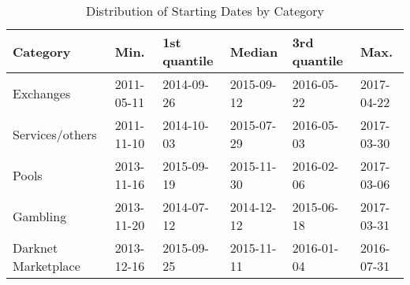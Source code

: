 \begin{table}[ht]
\centering
\begin{tabular}{llllll}
  \hline
Category & Min. & 1st quantile & Median & 3rd quantile & Max. \\ 
  \hline
Exchanges & 2011-05-11 & 2014-09-26 & 2015-09-12 & 2016-05-22 & 2017-04-22 \\ 
  Services/others & 2011-11-10 & 2014-10-03 & 2015-07-29 & 2016-05-03 & 2017-03-30 \\ 
  Pools & 2013-11-16 & 2015-09-19 & 2015-11-30 & 2016-02-06 & 2017-03-06 \\ 
  Gambling & 2013-11-20 & 2014-07-12 & 2014-12-12 & 2015-06-18 & 2017-03-31 \\ 
  Darknet Marketplace & 2013-12-16 & 2015-09-25 & 2015-11-11 & 2016-01-04 & 2016-07-31 \\ 
   \hline
\end{tabular}
\caption{Distribution of Starting Dates by Category} 
\label{date_cat}
\end{table}
